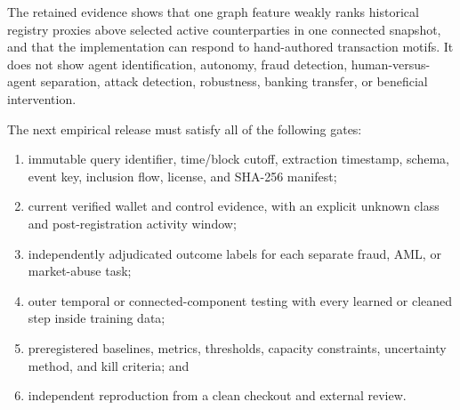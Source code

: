 The retained evidence shows that one graph feature weakly ranks historical
registry proxies above selected active counterparties in one connected
snapshot, and that the implementation can respond to hand-authored transaction
motifs.  It does not show agent identification, autonomy, fraud detection,
human-versus-agent separation, attack detection, robustness, banking transfer,
or beneficial intervention.

The next empirical release must satisfy all of the following gates:

\begin{enumerate}[leftmargin=2em]
  \item immutable query identifier, time/block cutoff, extraction timestamp,
    schema, event key, inclusion flow, license, and SHA-256 manifest;
  \item current verified wallet and control evidence, with an explicit unknown
    class and post-registration activity window;
  \item independently adjudicated outcome labels for each separate fraud, AML,
    or market-abuse task;
  \item outer temporal or connected-component testing with every learned or
    cleaned step inside training data;
  \item preregistered baselines, metrics, thresholds, capacity constraints,
    uncertainty method, and kill criteria; and
  \item independent reproduction from a clean checkout and external review.
\end{enumerate}
